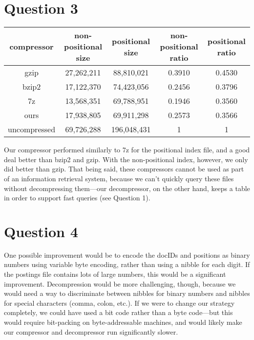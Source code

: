 \documentclass[11pt]{article}
\begin{document}
\section{Question 3}

\centering
\begin{tabular}{|c||c|c||c|c|}
\hline
\textbf{compressor} & \textbf{non-positional size} & \textbf{positional size}
& \textbf{non-positional ratio} & \textbf{positional ratio}\\
\hline
gzip & 27,262,211 & 88,810,021 & 0.3910 & 0.4530 \\
bzip2 & 17,122,370 & 74,423,056 & 0.2456 & 0.3796 \\
7z & 13,568,351 & 69,788,951 & 0.1946 & 0.3560 \\
ours & 17,938,805 & 69,911,298 & 0.2573 & 0.3566 \\
uncompressed & 69,726,288 & 196,048,431 & 1 & 1\\
\hline
\end{tabular}

\flushleft
Our compressor performed similarly to 7z for the positional index file, and a good deal better
than bzip2 and gzip. With the non-positional index, however, we only did better than gzip.
That being said, these compressors cannot be used as part of an information retrieval system, because
we can't quickly query these files without decompressing them---our decompressor, on the other hand,
keeps a table in order to support fast queries (see Question 1).

\section{Question 4}

One possible improvement would be to encode the docIDs and positions
as binary numbers using variable byte encoding, 
rather than using a nibble for each digit. If the postings file contains lots of large
numbers, this would be a significant improvement.
Decompression would be more challenging, though, 
because we would need a way to discriminate
between nibbles for binary numbers and nibbles for special characters (comma, colon, etc.).
If we were to change our strategy completely, we could have used a bit code
rather than a byte code---but this would require bit-packing on byte-addressable
machines, and would likely make our compressor and decompressor run significantly slower.
\end{document}
